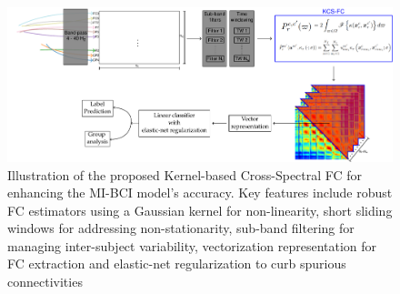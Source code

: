 \begin{figure}[!h]
    \centering
    \includegraphics[scale=0.6]{Figures/outline_and_contributions/contribution1_C.pdf}
    \caption{Illustration of the proposed Kernel-based Cross-Spectral FC for enhancing the MI-BCI model's accuracy. Key features include robust FC estimators using a Gaussian kernel for non-linearity, short sliding windows for addressing non-stationarity, sub-band filtering for managing inter-subject variability, vectorization representation for FC extraction and elastic-net regularization to curb spurious connectivities \label{fig:contribution1}}
\end{figure}

